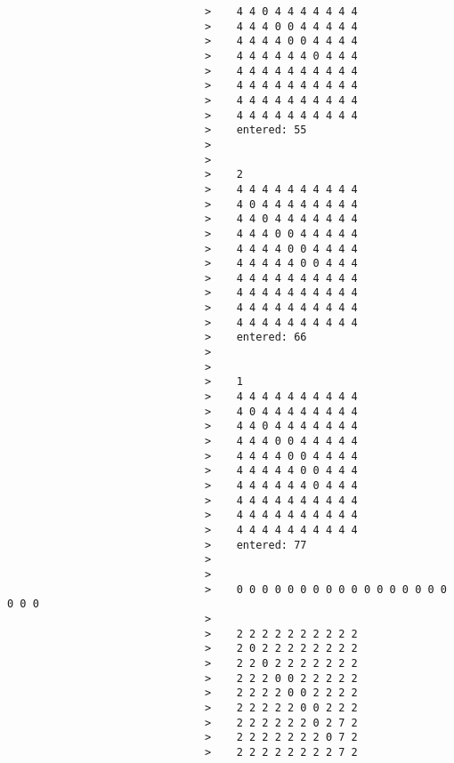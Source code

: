 \documentclass[12pt]{book}
\begin{document}
\begin{lstlisting}
                               >    4 4 0 4 4 4 4 4 4 4 
                               >    4 4 4 0 0 4 4 4 4 4 
                               >    4 4 4 4 0 0 4 4 4 4 
                               >    4 4 4 4 4 4 0 4 4 4 
                               >    4 4 4 4 4 4 4 4 4 4 
                               >    4 4 4 4 4 4 4 4 4 4 
                               >    4 4 4 4 4 4 4 4 4 4 
                               >    4 4 4 4 4 4 4 4 4 4 
                               >    entered: 55
                               >
                               >
                               >    2 
                               >    4 4 4 4 4 4 4 4 4 4 
                               >    4 0 4 4 4 4 4 4 4 4 
                               >    4 4 0 4 4 4 4 4 4 4 
                               >    4 4 4 0 0 4 4 4 4 4 
                               >    4 4 4 4 0 0 4 4 4 4 
                               >    4 4 4 4 4 0 0 4 4 4 
                               >    4 4 4 4 4 4 4 4 4 4 
                               >    4 4 4 4 4 4 4 4 4 4 
                               >    4 4 4 4 4 4 4 4 4 4 
                               >    4 4 4 4 4 4 4 4 4 4 
                               >    entered: 66 
                               >
                               >
                               >    1 
                               >    4 4 4 4 4 4 4 4 4 4 
                               >    4 0 4 4 4 4 4 4 4 4 
                               >    4 4 0 4 4 4 4 4 4 4 
                               >    4 4 4 0 0 4 4 4 4 4 
                               >    4 4 4 4 0 0 4 4 4 4 
                               >    4 4 4 4 4 0 0 4 4 4 
                               >    4 4 4 4 4 4 0 4 4 4 
                               >    4 4 4 4 4 4 4 4 4 4 
                               >    4 4 4 4 4 4 4 4 4 4 
                               >    4 4 4 4 4 4 4 4 4 4 
                               >    entered: 77 
                               >
                               >
                               >    0 0 0 0 0 0 0 0 0 0 0 0 0 0 0 0 0 0 0 0 
                               >
                               >    2 2 2 2 2 2 2 2 2 2 
                               >    2 0 2 2 2 2 2 2 2 2 
                               >    2 2 0 2 2 2 2 2 2 2 
                               >    2 2 2 0 0 2 2 2 2 2 
                               >    2 2 2 2 0 0 2 2 2 2 
                               >    2 2 2 2 2 0 0 2 2 2 
                               >    2 2 2 2 2 2 0 2 7 2 
                               >    2 2 2 2 2 2 2 0 7 2 
                               >    2 2 2 2 2 2 2 2 7 2 

\end{lstlisting}
\end{document}
